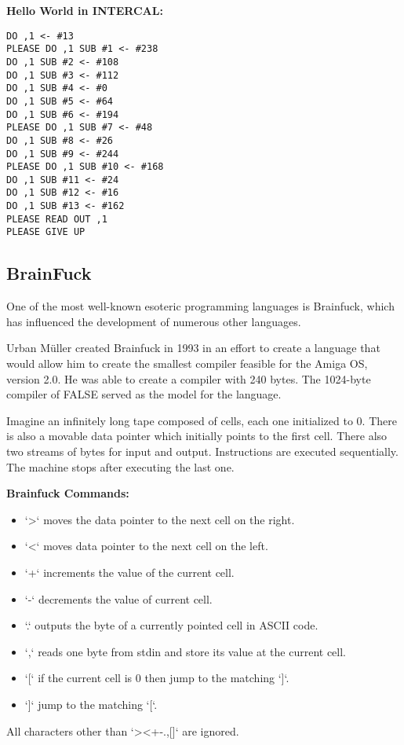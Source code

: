 \documentclass{article}  %
\begin{document}
\textbf{Hello World in INTERCAL:}
\begin{verbatim}
DO ,1 <- #13
PLEASE DO ,1 SUB #1 <- #238
DO ,1 SUB #2 <- #108
DO ,1 SUB #3 <- #112
DO ,1 SUB #4 <- #0
DO ,1 SUB #5 <- #64
DO ,1 SUB #6 <- #194
PLEASE DO ,1 SUB #7 <- #48
DO ,1 SUB #8 <- #26
DO ,1 SUB #9 <- #244
PLEASE DO ,1 SUB #10 <- #168
DO ,1 SUB #11 <- #24
DO ,1 SUB #12 <- #16
DO ,1 SUB #13 <- #162
PLEASE READ OUT ,1
PLEASE GIVE UP
\end{verbatim} 
\cite{INTERCAL}

\subsection{BrainFuck}
One of the most well-known esoteric programming languages is Brainfuck, which has influenced the development of numerous other languages.

Urban Müller created Brainfuck in 1993 in an effort to create a language that would allow him to create the smallest compiler feasible for the Amiga OS, version 2.0. He was able to create a compiler with 240 bytes. The 1024-byte compiler of FALSE served as the model for the language.

Imagine an infinitely long tape composed of cells, each one initialized to 0. There is also a movable data pointer which initially points to the first cell. There also two streams of bytes for input and output. Instructions are executed sequentially. The machine stops after executing the last one.

\textbf{Brainfuck Commands:}
\begin{itemize}
    \item `>` moves the data pointer to the next cell on the right.
    \item `<` moves data pointer to the next cell on the left.
    \item `+` increments the value of the current cell.
    \item `-` decrements the value of current cell.
    \item `.` outputs the byte of a currently pointed cell in ASCII code.
    \item `,` reads one byte from stdin and store its value at the current cell.
    \item `[` if the current cell is 0 then jump to the matching `]`.
    \item `]` jump to the matching `[`.
\end{itemize}

All characters other than `><+-.,[]` are ignored.
\end{document}
